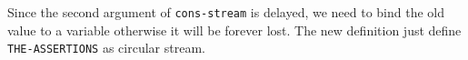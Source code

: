 \documentclass[a4paper,12pt]{article}
\begin{document}
Since the second argument of \lstinline!cons-stream! is delayed, we
need to bind the old value to a variable otherwise it will be forever
lost.  The new definition just define \lstinline!THE-ASSERTIONS! as
circular stream.
\end{document}
